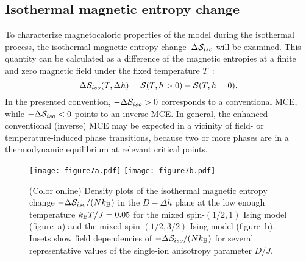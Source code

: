 \documentclass[final,5p,times,sort&compress]{elsarticle}
\begin{document}
\subsection{Isothermal magnetic entropy change}
\label{subsec:34}

To characterize magnetocaloric properties of the model during the isothermal process, the isothermal magnetic entropy change~$\Delta {\cal S}_{iso}$ will be examined. This quantity can be calculated as a difference of the magnetic entropies at a finite and zero magnetic field under the fixed temperature $T$~\cite{Tis03}:
\begin{equation}
\label{eq:S_iso}
\Delta{\cal S}_{iso} (T, \Delta h) = {\cal S}(T, h>0) - {\cal S}(T, h=0).
\end{equation}
In the presented convention, $-\Delta {\cal S}_{iso}>0$ corresponds to a conventional MCE, while $-\Delta {\cal S}_{iso}<0$ points to an inverse MCE. In general, the enhanced conventional (inverse) MCE may be expected in a vicinity of field- or temperature-induced phase transitions, because two or more phases are in a thermodynamic equilibrium at relevant critical points.
\begin{figure*}[t!]
\vspace{0.1cm}
\centering
  \texttt{[image: figure7a.pdf]}
  \hspace{-0.25cm}
  \texttt{[image: figure7b.pdf]}
\vspace{-0.25cm}
\caption{(Color online) Density plots of the isothermal magnetic entropy change $-\Delta{\cal S}_{iso}/(Nk_{\rm B})$ in the $D-\Delta h$ plane at the low enough temperature $k_{\rm B}T/J=0.05$ for the mixed spin-$(1/2,1)$ Ising model (figure~a) and the mixed spin-$(1/2,3/2)$ Ising model (figure~b). Insets show field dependencies of $-\Delta{\cal S}_{iso}/(Nk_{\rm B})$ for several representative values of the single-ion anisotropy parameter $D/J$.}
\label{fig:7}
\end{figure*}
\end{document}
